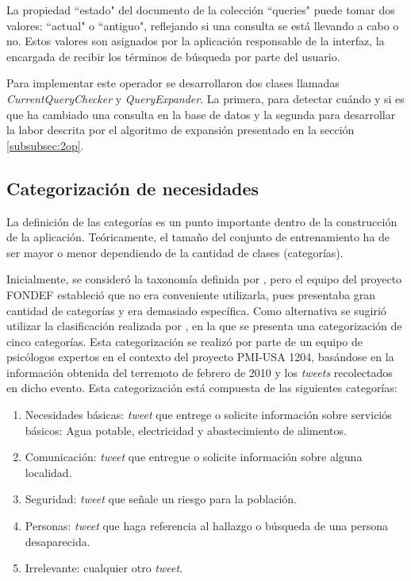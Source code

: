 La propiedad ``estado" del documento de la colección ``queries" puede tomar dos valores: ``actual" o ``antiguo", reflejando si una consulta se está llevando a cabo o no. Estos valores son asignados por la aplicación responsable de la interfaz, la encargada de recibir los términos de búsqueda por parte del usuario.

Para implementar este operador se desarrollaron dos clases llamadas \textit{CurrentQueryChecker} y \textit{QueryExpander}. La primera, para detectar cuándo y si es que ha cambiado una consulta en la base de datos y la segunda para desarrollar la labor descrita por el algoritmo de expansión presentado en la sección \ref{subsubsec:2op}.

\subsection{Categorización de necesidades}
\label{sec:diseno:categorias}

La definición de las categorías es un punto importante dentro de la construcción de la aplicación. Teóricamente, el tamaño del conjunto de entrenamiento ha de ser mayor o menor dependiendo de la cantidad de clases (categorías). 

Inicialmente, se consideró la taxonomía definida por \cite{TaxonomiaChato}, pero el equipo del proyecto FONDEF estableció que no era conveniente utilizarla, pues presentaba gran cantidad de categorías y era demasiado específica. Como alternativa se sugirió utilizar la clasificación realizada por \cite{PMIProfes}, en la que se presenta una categorización de cinco categorías. Esta categorización se realizó por parte de un equipo de psicólogos expertos en el contexto del proyecto PMI-USA 1204, basándose en la información obtenida del terremoto de febrero de 2010 y los \textit{tweets} recolectados en dicho evento. Esta categorización está compuesta de las siguientes categorías:

\begin{enumerate}
\item Necesidades básicas: \textit{tweet} que entrege o solicite información sobre serviciós básicos: Agua potable, electricidad y abastecimiento de alimentos.
\item Comunicación: \textit{tweet} que entregue o solicite información sobre alguna localidad.
\item Seguridad: \textit{tweet} que señale un riesgo para la población.
\item Personas: \textit{tweet} que haga referencia al hallazgo o búsqueda de una persona desaparecida.
\item Irrelevante: cualquier otro \textit{tweet}.
\end{enumerate}

